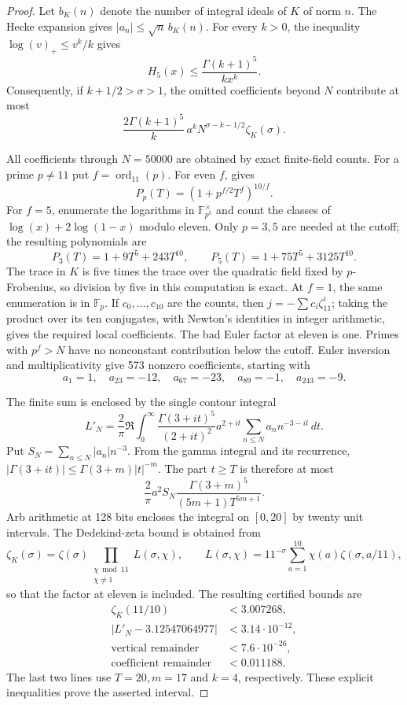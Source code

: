 \begin{proof}
Let $b_K(n)$ denote the number of integral ideals of $K$ of norm $n$.
The Hecke expansion gives $|a_n|\le\sqrt n\,b_K(n)$.  For every
$k>0$, the inequality $\log(v)_+\le v^k/k$ gives
\[
 H_5(x)\le\frac{\Gamma(k+1)^5}{k x^k}.
\]
Consequently, if $k+1/2>\sigma>1$, the omitted coefficients beyond
$N$ contribute at most
\begin{equation}
 \frac{2\Gamma(k+1)^5}{k}\,a^k
       N^{\sigma-k-1/2}\zeta_K(\sigma).
 \label{eq:eleven-rankone-tail}
\end{equation}

All coefficients through $N=50000$ are obtained by exact finite-field
counts.  For a prime $p\ne11$ put $f=\operatorname{ord}_{11}(p)$.
For even $f$, \citet[Lemma~1.1, p.~203]{GrossRohrlich1978} gives
\[
 P_p(T)=(1+p^{f/2}T^f)^{10/f}.
\]
For $f=5$, enumerate the logarithms in $\mathbb F_{p^5}^{\times}$
and count the classes of $\log(x)+2\log(1-x)$ modulo eleven.
Only $p=3,5$ are needed at the cutoff; the resulting polynomials are
\[
 P_3(T)=1+9T^5+243T^{10},\qquad
 P_5(T)=1+75T^5+3125T^{10}.
\]
The trace in $K$ is five times the trace over the quadratic field
fixed by $p$-Frobenius, so division by five in this computation is
exact.  At $f=1$, the same enumeration is in $\mathbb F_p$.
If $c_0,\ldots,c_{10}$ are the counts, then
$j=-\sum c_i\zeta_{11}^i$; taking the product over its ten
conjugates, with Newton's identities in integer arithmetic, gives
the required local coefficients.  The bad Euler factor at eleven
is one.  Primes with $p^f>N$ have no nonconstant contribution below
the cutoff.  Euler inversion and multiplicativity give 573 nonzero
coefficients, starting with
\[
 a_1=1,\quad a_{23}=-12,\quad a_{67}=-23,\quad
 a_{89}=-1,\quad a_{243}=-9.
\]

The finite sum is enclosed by the single contour integral
\[
 L'_N=\frac2\pi\Re\int_0^\infty
       \frac{\Gamma(3+it)^5}{(2+it)^2}
       a^{2+it}\sum_{n\le N}a_n n^{-3-it}\,dt.
\]
Put $S_N=\sum_{n\le N}|a_n|n^{-3}$.  From the gamma integral and
its recurrence, $|\Gamma(3+it)|\le\Gamma(3+m)|t|^{-m}$.
The part $t\ge T$ is therefore at most
\begin{equation}
 \frac2\pi a^2S_N
    \frac{\Gamma(3+m)^5}{(5m+1)T^{5m+1}}.
 \label{eq:eleven-rankone-vertical}
\end{equation}
Arb arithmetic at 128 bits encloses the integral on $[0,20]$ by
twenty unit intervals.  The Dedekind-zeta bound is obtained from
\[
 \zeta_K(\sigma)=\zeta(\sigma)
       \prod_{\substack{\chi\bmod11\\\chi\ne1}}L(\sigma,\chi),
 \qquad
 L(\sigma,\chi)=11^{-\sigma}\sum_{a=1}^{10}
                   \chi(a)\zeta(\sigma,a/11),
\]
so that the factor at eleven is included.  The resulting certified
bounds are
\[
 \begin{aligned}
 \zeta_K(11/10)&<3.007268,\\
 |L'_N-3.12547064977|&<3.14\cdot10^{-12},\\
 \text{vertical remainder}&<7.6\cdot10^{-26},\\
 \text{coefficient remainder}&<0.011188.
 \end{aligned}
\]
The last two lines use $T=20,m=17$ and $k=4$, respectively.
These explicit inequalities prove the asserted interval.


\end{proof}
